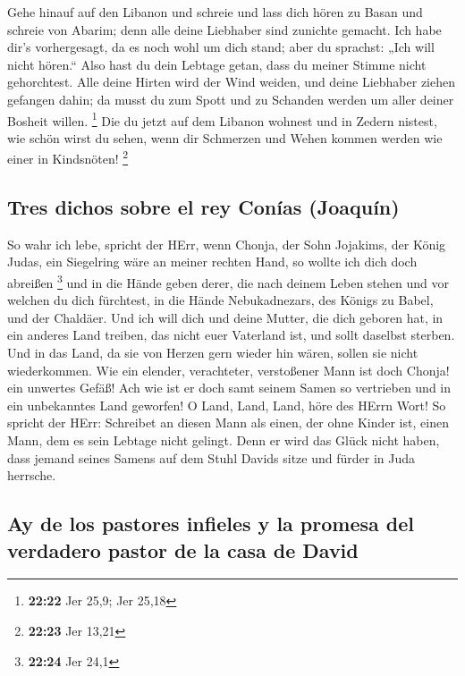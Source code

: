  Gehe hinauf auf den Libanon und schreie und lass dich
hören zu Basan und schreie von Abarim; denn alle deine Liebhaber sind
zunichte gemacht.  Ich habe dir's vorhergesagt, da es
noch wohl um dich stand; aber du sprachst: „Ich will nicht hören.`` Also
hast du dein Lebtage getan, dass du meiner Stimme nicht gehorchtest.
 Alle deine Hirten wird der Wind weiden, und deine
Liebhaber ziehen gefangen dahin; da musst du zum Spott und zu Schanden
werden um aller deiner Bosheit willen. \footnote{\textbf{22:22} Jer
  25,9; Jer 25,18}  Die du jetzt auf dem Libanon wohnest
und in Zedern nistest, wie schön wirst du sehen, wenn dir Schmerzen und
Wehen kommen werden wie einer in Kindsnöten! \footnote{\textbf{22:23}
  Jer 13,21}

\hypertarget{tres-dichos-sobre-el-rey-conuxedas-joaquuxedn}{%
\subsection{Tres dichos sobre el rey Conías
(Joaquín)}\label{tres-dichos-sobre-el-rey-conuxedas-joaquuxedn}}

 So wahr ich lebe, spricht der HErr, wenn Chonja, der
Sohn Jojakims, der König Judas, ein Siegelring wäre an meiner rechten
Hand, so wollte ich dich doch abreißen \footnote{\textbf{22:24} Jer 24,1}
 und in die Hände geben derer, die nach deinem Leben
stehen und vor welchen du dich fürchtest, in die Hände Nebukadnezars,
des Königs zu Babel, und der Chaldäer.  Und ich will dich
und deine Mutter, die dich geboren hat, in ein anderes Land treiben, das
nicht euer Vaterland ist, und sollt daselbst sterben. 
Und in das Land, da sie von Herzen gern wieder hin wären, sollen sie
nicht wiederkommen.  Wie ein elender, verachteter,
verstoßener Mann ist doch Chonja! ein unwertes Gefäß! Ach wie ist er
doch samt seinem Samen so vertrieben und in ein unbekanntes Land
geworfen!  O Land, Land, Land, höre des HErrn Wort!
 So spricht der HErr: Schreibet an diesen Mann als einen,
der ohne Kinder ist, einen Mann, dem es sein Lebtage nicht gelingt. Denn
er wird das Glück nicht haben, dass jemand seines Samens auf dem Stuhl
Davids sitze und fürder in Juda herrsche.

\hypertarget{ay-de-los-pastores-infieles-y-la-promesa-del-verdadero-pastor-de-la-casa-de-david}{%
\subsection{Ay de los pastores infieles y la promesa del verdadero
pastor de la casa de
David}\label{ay-de-los-pastores-infieles-y-la-promesa-del-verdadero-pastor-de-la-casa-de-david}}

